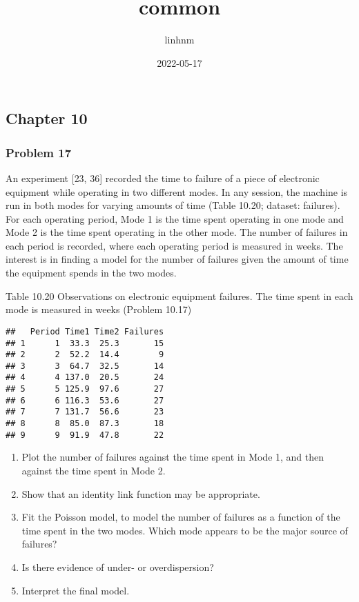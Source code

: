\documentclass[
]{article}
\title{common}
\author{linhnm}
\date{2022-05-17}
\providecommand{\tightlist}{%
  \setlength{\itemsep}{0pt}\setlength{\parskip}{0pt}}
\begin{document}
\maketitle

\hypertarget{chapter-10}{%
\subsection{Chapter 10}\label{chapter-10}}

\hypertarget{problem-17}{%
\subsubsection{Problem 17}\label{problem-17}}

An experiment {[}23, 36{]} recorded the time to failure of a piece of
electronic equipment while operating in two diﬀerent modes. In any
session, the machine is run in both modes for varying amounts of time
(Table 10.20; dataset: failures). For each operating period, Mode 1 is
the time spent operating in one mode and Mode 2 is the time spent
operating in the other mode. The number of failures in each period is
recorded, where each operating period is measured in weeks. The interest
is in ﬁnding a model for the number of failures given the amount of time
the equipment spends in the two modes.

Table 10.20 Observations on electronic equipment failures. The time
spent in each mode is measured in weeks (Problem 10.17)

\begin{verbatim}
##   Period Time1 Time2 Failures
## 1      1  33.3  25.3       15
## 2      2  52.2  14.4        9
## 3      3  64.7  32.5       14
## 4      4 137.0  20.5       24
## 5      5 125.9  97.6       27
## 6      6 116.3  53.6       27
## 7      7 131.7  56.6       23
## 8      8  85.0  87.3       18
## 9      9  91.9  47.8       22
\end{verbatim}

\begin{enumerate}
\def\labelenumi{\arabic{enumi}.}
\tightlist
\item
  Plot the number of failures against the time spent in Mode 1, and then
  against the time spent in Mode 2.
\item
  Show that an identity link function may be appropriate.
\item
  Fit the Poisson model, to model the number of failures as a function
  of the time spent in the two modes. Which mode appears to be the major
  source of failures?
\item
  Is there evidence of under- or overdispersion?
\item
  Interpret the ﬁnal model.
\end{enumerate}
\end{document}
